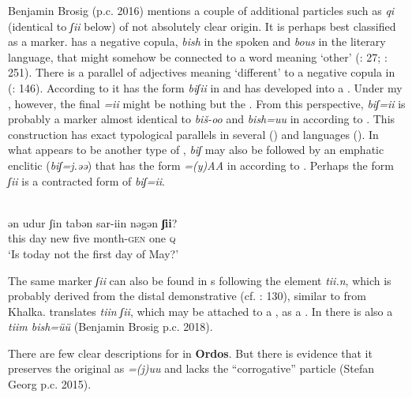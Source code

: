 Benjamin Brosig (p.c. 2016) mentions a couple of additional particles such as \textit{qi} (identical to \textit{ʃii} below) of not absolutely clear origin. It is perhaps best classified as a  marker.  has a negative copula, \textit{bish} in the spoken and \textit{bous} in the literary language, that might somehow be connected to a word meaning ‘other’ (\citealt{Janhunen2003a}: 27; \citealt{Janhunen2012c}: 251). There is a parallel  of adjectives meaning ‘different’ to a negative copula in  (\citealt{Hölzl2015a}: 146). According to \citet{Chaganhada1991} it has the form \textit{biʃii} in  and has developed into a . Under my , however, the final \textit{=ii} might be nothing but the . From this perspective, \textit{biʃ=ii} is probably a  marker almost identical to  \textit{biš-oo} and \textit{bish=uu} in  according to \citet[251]{Janhunen2012c}. This construction has exact typological parallels in several  () and  languages (). In what appears to be another type of ,  \textit{biʃ} may also be followed by an emphatic enclitic (\textit{biʃ=j.əə}) that has the form \textit{=(y)AA} in  according to \citet[93]{Janhunen2012c}. Perhaps the form \textit{ʃii} is a contracted form of \textit{biʃ=ii}.

\ea%
    \label{ex:mong:31}
     \\
    \gll ən  udur  ʃin  tabən  sar-iin    nəgən \textbf{{ʃii}}?\\
    this  day  new  five  month-\textsc{gen}  one  \textsc{q}\\
    \glt ‘Is today not the first day of May?’ \citep[71]{Chaganhada1991}
    \z

\noindent The same marker \textit{ʃii} can also be found in s following the element \textit{tii.n}, which is probably derived from the distal demonstrative (cf. \citealt{Janhunen2012c}: 130), similar to  from Khalka. \citet[72]{Chaganhada1991} translates \textit{tiin} \textit{ʃii}, which may be attached to a , as a . In  there is also a  \textit{tiim bish=üü} (Benjamin Brosig p.c. 2018).

There are few clear descriptions for  in \textbf{Ordos}. But there is evidence that it preserves the original  as \textit{=(j)uu} and lacks the “corrogative” particle (Stefan Georg p.c. 2015).

